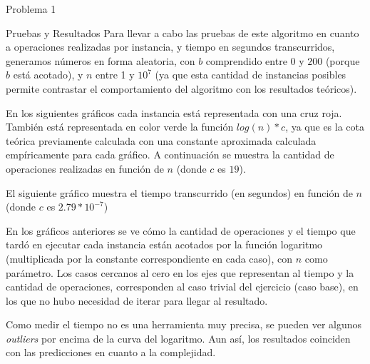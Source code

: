 \begin{section}{Problema 1}
\begin{subsection}{Pruebas y Resultados}
		Para llevar a cabo las pruebas de este algoritmo en cuanto a operaciones realizadas por instancia, y tiempo en segundos transcurridos, generamos números en forma aleatoria, con $b$ comprendido entre $0$ y $200$ (porque $b$ está acotado), y $n$ entre 1 y $10^7$ (ya que esta cantidad de instancias posibles permite contrastar el comportamiento del algoritmo con los resultados teóricos).

En los siguientes gráficos cada instancia está representada con una cruz roja. También está representada en color verde la función $log(n)*c$, ya que es la cota teórica previamente calculada con una constante aproximada calculada empíricamente para cada gráfico. A continuación se muestra la cantidad de operaciones realizadas en función de $n$ (donde $c$ es $19$).\VSP

		\VSP
		
		\newpage

El siguiente gráfico muestra el tiempo transcurrido (en segundos) en función de $n$ (donde $c$ es $2.79*10^{-7}$)\VSP


En los gráficos anteriores se ve cómo la cantidad de operaciones y el tiempo que tardó en ejecutar cada instancia están acotados por la función logaritmo (multiplicada por la constante correspondiente en cada caso), con $n$ como parámetro. Los casos cercanos al cero en los ejes que representan al tiempo y la cantidad de operaciones, co\-rres\-pon\-den al caso trivial del ejercicio (caso base), en los que no hubo necesidad de iterar para llegar al resultado.

		Como medir el tiempo no es una herramienta muy precisa, se pueden ver algunos {\em outliers} por encima de la curva del logaritmo. Aun así, los resultados coinciden con las predicciones en cuanto a la complejidad.\Pa


\end{subsection}
\end{section}
